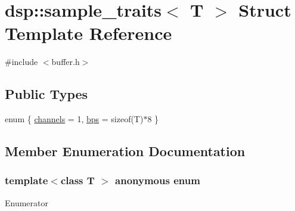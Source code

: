 \hypertarget{structdsp_1_1sample__traits}{}\section{dsp\+:\+:sample\+\_\+traits$<$ T $>$ Struct Template Reference}
\label{structdsp_1_1sample__traits}


{\ttfamily \#include $<$buffer.\+h$>$}

\subsection*{Public Types}
\begin{DoxyCompactItemize}
\item 
enum \{ \hyperlink{structdsp_1_1sample__traits_ae7a6cec7b50f595d913e58efda9cbabaa4c4d1528912adaf37d04b70c09f467c0}{channels} = 1, 
\hyperlink{structdsp_1_1sample__traits_ae7a6cec7b50f595d913e58efda9cbabaaebe24230df11df9608b35d5e8d0aea43}{bps} = sizeof(T)$\ast$8
 \}
\end{DoxyCompactItemize}


\subsection{Member Enumeration Documentation}
\subsubsection[{\texorpdfstring{anonymous enum}{anonymous enum}}]{\setlength{\rightskip}{0pt plus 5cm}template$<$class T $>$ anonymous enum}\hypertarget{structdsp_1_1sample__traits_ae7a6cec7b50f595d913e58efda9cbaba}{}\label{structdsp_1_1sample__traits_ae7a6cec7b50f595d913e58efda9cbaba}
\begin{Desc}
\item[Enumerator]\par
\begin{description}
\item[{\em 
channels\hypertarget{structdsp_1_1sample__traits_ae7a6cec7b50f595d913e58efda9cbabaa4c4d1528912adaf37d04b70c09f467c0}{}\label{structdsp_1_1sample__traits_ae7a6cec7b50f595d913e58efda9cbabaa4c4d1528912adaf37d04b70c09f467c0}
}]\item[{\em 
bps\hypertarget{structdsp_1_1sample__traits_ae7a6cec7b50f595d913e58efda9cbabaaebe24230df11df9608b35d5e8d0aea43}{}\label{structdsp_1_1sample__traits_ae7a6cec7b50f595d913e58efda9cbabaaebe24230df11df9608b35d5e8d0aea43}
}]\end{description}
\end{Desc}


